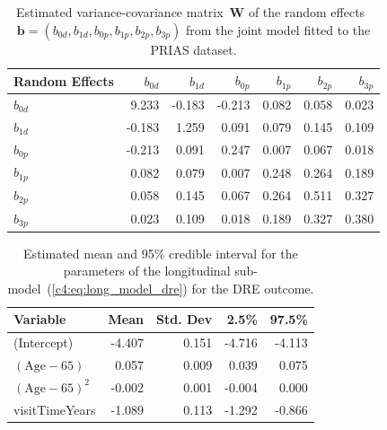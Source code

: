 \begin{subappendices}
\begin{table}
\small
\centering
\caption{Estimated variance-covariance matrix~$\boldsymbol{W}$ of the random effects~${\boldsymbol{b}=(b_{0d},b_{1d},b_{0p}, b_{1p}, b_{2p}, b_{3p})}$ from the joint model fitted to the PRIAS dataset.}
\label{c4:tab:D_matrix}
\begin{tabular}{lrrrrrr}
\toprule
Random Effects    & $b_{0d}$    & $b_{1d}$    & $b_{0p}$    & $b_{1p}$   & $b_{2p}$   & $b_{3p}$ \\
\midrule
$b_{0d}$ & 9.233 & -0.183 & -0.213 & 0.082 & 0.058 & 0.023 \\
$b_{1d}$ & -0.183 & 1.259 & 0.091 & 0.079 & 0.145 & 0.109 \\
\midrule
$b_{0p}$ & -0.213 & 0.091 & 0.247 & 0.007 & 0.067 & 0.018 \\
$b_{1p}$ & 0.082 & 0.079 & 0.007 & 0.248 & 0.264 & 0.189 \\
$b_{2p}$ & 0.058 & 0.145 & 0.067 & 0.264 & 0.511 & 0.327 \\
$b_{3p}$ & 0.023 & 0.109 & 0.018 & 0.189 & 0.327 & 0.380 \\
\bottomrule
\end{tabular}
\end{table}

\begin{table}
\small
\centering
\caption{Estimated mean and 95\% credible interval for the parameters of the longitudinal sub-model~(\ref{c4:eq:long_model_dre}) for the DRE outcome.}
\label{c4:tab:DRE_long}
\begin{tabular}{lrrrr}
\toprule
Variable                         & Mean & Std. Dev & 2.5\%  & 97.5\%   \\
\midrule
(Intercept)                      & -4.407 & 0.151 & -4.716 & -4.113 \\
$(\mbox{Age} - 65)$              & 0.057 & 0.009 & 0.039 & 0.075 \\
$(\mbox{Age} - 65)^2$            & -0.002 & 0.001 & -0.004 & 0.000\\
visitTimeYears                   & -1.089 & 0.113 & -1.292 & -0.866 \\
\bottomrule
\end{tabular}
\end{table}


\end{subappendices}

